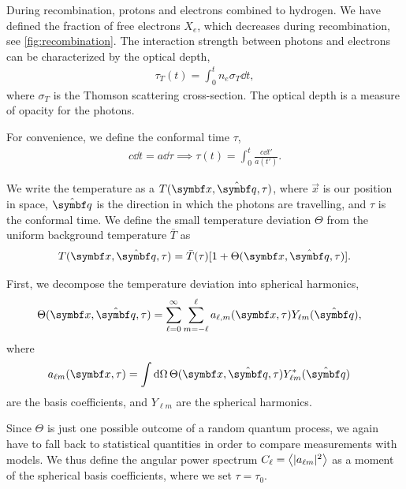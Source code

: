 During recombination, protons and electrons combined to hydrogen. We have defined the fraction of free electrons $X_e$, which decreases during recombination, see \cref{fig:recombination}. The interaction strength between photons and electrons can be characterized by the optical depth,
\begin{align*}
	\tau_T(t) = \int_0^t n_e \sigma_T \dd{t},
\end{align*}
where $\sigma_T$ is the Thomson scattering cross-section. The optical depth is a measure of opacity for the photons.

For convenience, we define the conformal time $\tau$,
\begin{align*}
	c \dd{t} = a \dd{\tau}
	\implies \tau(t) = \int_0^t \frac{c \dd{t'}}{a(t')}.
\end{align*}

We write the temperature as a $T(\vec{x}, \uvec{q}, \tau)$, where $\vec{x}$ is our position in space, $\uvec{q}$ is the direction in which the photons are travelling, and $\tau$ is the conformal time. We define the small temperature deviation $\Theta$ from the uniform background temperature $\bar{T}$ as
\begin{align*}
	T(\vec{x}, \uvec{q}, \tau) = \bar{T}(\tau) [1 + \Theta(\vec{x}, \uvec{q}, \tau)].
\end{align*}

First, we decompose the temperature deviation into spherical harmonics,
\begin{align*}
	\Theta(\vec{x}, \uvec{q}, \tau)
	&= \sum_{\ell=0}^{\infty} \sum_{m=-\ell}^{\ell} a_{\ell,m}(\vec{x}, \tau) Y_{\ell m}(\uvec{q}),
\end{align*}
where 
\begin{align*}
	a_{\ell m}(\vec{x}, \tau)
	&= \int \dd{\Omega} \Theta(\vec{x}, \uvec{q}, \tau) Y^*_{\ell m}(\uvec{q}) 	
\end{align*}
are the basis coefficients, and $Y_{\ell m}$ are the spherical harmonics.

Since $\Theta$ is just one possible outcome of a random quantum process, we again have to fall back to statistical quantities in order to compare measurements with models.
We thus define the angular power spectrum $C_\ell = \left\langle \vert a_{\ell m}\vert^2 \right\rangle$ as a moment of the spherical basis coefficients, where we set $\tau = \tau_0$.

